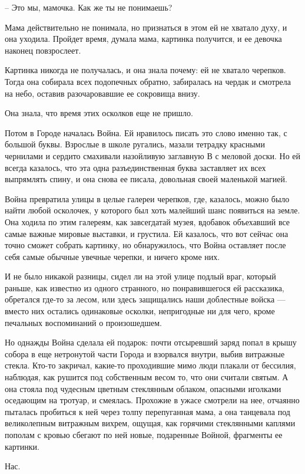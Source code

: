 \documentclass[a5paper]{article}
\begin{document}
-- Это мы, мамочка. Как же ты не понимаешь?

Мама действительно не понимала, но признаться в этом ей не хватало духу, и она уходила. Пройдет время, думала мама, картинка получится, и ее девочка наконец повзрослеет.

Картинка никогда не получалась, и она знала почему: ей не хватало черепков. Тогда она собирала всех подопечных обратно, забиралась на чердак и смотрела на небо, оставив разочаровавшие ее сокровища внизу.

Она знала, что время этих осколков еще не пришло.

Потом в Городе началась Война. Ей нравилось писать это слово именно так, с большой буквы. Взрослые в школе ругались, мазали тетрадку красными чернилами и сердито смахивали назойливую заглавную В с меловой доски. Но ей всегда казалось, что эта одна разъединственная буква заставляет их всех выпрямлять спину, и она снова ее писала, довольная своей маленькой магией.

Война превратила улицы в целые галереи черепков, где, казалось, можно было найти любой осколочек, у которого был хоть малейший шанс появиться на земле. Она ходила по этим галереям, как завсегдатай музея, вдобавок объехавший все самые важные мировые выставки, и грустила. Ей казалось, что вот сейчас она точно сможет собрать картинку, но обнаружилось, что Война оставляет после себя самые обычные увечные черепки, и ничего кроме них.

И не было никакой разницы, сидел ли на этой улице подлый враг, который раньше, как известно из одного странного, но понравившегося ей рассказика, обретался где-то за лесом, или здесь защищались наши доблестные войска --- вместо них остались одинаковые осколки, непригодные ни для чего, кроме печальных воспоминаний о произошедшем.

Но однажды Война сделала ей подарок: почти отсыревший заряд попал в крышу собора в еще нетронутой части Города и взорвался внутри, выбив витражные стекла. Кто-то закричал, какие-то проходившие мимо люди плакали от бессилия, наблюдая, как рушится под собственным весом то, что они считали святым. А она стояла под чудесным цветным стеклянным облаком, опасными иголками оседающим на тротуар, и смеялась. Прохожие в ужасе смотрели на нее, отчаянно пыталась пробиться к ней через толпу перепуганная мама, а она танцевала под великолепным витражным вихрем, ощущая, как горячими стеклянными каплями пополам с кровью сбегают по ней новые, подаренные Войной, фрагменты ее картинки.

Нас.
\end{document}
